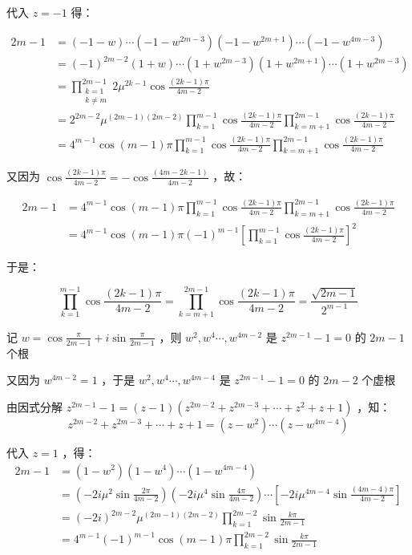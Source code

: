 代入 $z=-1$ 得：

\begin{equation}
\begin{aligned}
2m-1&=(-1-w)\cdots(-1-w^{2m-3})(-1-w^{2m+1})\cdots(-1-w^{4m-3})\\ &=(-1)^{2m-2}(1+w)\cdots(1+w^{2m-3})(1+w^{2m+1})\cdots(1+w^{2m-3})\\ &=\prod_{\substack{k=1\\k\neq m}}^{2m-1}2\mu^{2k-1}\cos\frac{(2k-1)\pi}{4m-2}\\ &=2^{2m-2}\mu^{(2m-1)(2m-2)}\prod_{k=1}^{m-1}\cos{\frac{(2k-1)\pi}{4m-2}}\prod_{k=m+1}^{2m-1}\cos{\frac{(2k-1)\pi}{4m-2}}\\ &=4^{m-1}\cos(m-1)\pi\prod_{k=1}^{m-1}\cos{\frac{(2k-1)\pi}{4m-2}}\prod_{k=m+1}^{2m-1}\cos{\frac{(2k-1)\pi}{4m-2}}
\end{aligned}
\end{equation}

又因为 $\displaystyle{\cos\frac{(2k-1)\pi}{4m-2}=-\cos\frac{(4m-2k-1)}{4m-2}}$ ，故：

\begin{equation}
\begin{aligned}
2m-1&=4^{m-1}\cos(m-1)\pi\prod_{k=1}^{m-1}\cos{\frac{(2k-1)\pi}{4m-2}}\prod_{k=m+1}^{2m-1}\cos{\frac{(2k-1)\pi}{4m-2}}\\ &=4^{m-1}\cos(m-1)\pi(-1)^{m-1}\left[\prod_{k=1}^{m-1}\cos{\frac{(2k-1)\pi}{4m-2}}\right]^2
\end{aligned}
\end{equation}

于是：

\begin{equation}%
\prod_{k=1}^{m-1}\cos{\frac{(2k-1)\pi}{4m-2}}=\prod_{k=m+1}^{2m-1}\cos{\frac{(2k-1)\pi}{4m-2}}=\frac{\sqrt{2m-1}}{2^{m-1}}
\end{equation}

记 $\displaystyle{w=\cos\frac{\pi}{2m-1}+i\sin\frac{\pi}{2m-1}}$ ，则 $w^2,w^4\cdots,w^{4m-2}$ 是 $z^{2m-1}-1=0$ 的 $2m-1$ 个根

又因为 $w^{4m-2}=1$ ，于是 $w^2,w^4\cdots ,w^{4m-4}$ 是 $z^{2m-1}-1=0$ 的 $2m-2$ 个虚根

由因式分解 $\displaystyle{z^{2m-1}-1=(z-1)(z^{2m-2}+z^{2m-3}+\cdots+z^{2}+z+1)}$ ，知：
$$z^{2m-2}+z^{2m-3}+\cdots+z+1=(z-w^2)\cdots(z-w^{4m-4})$$

代入 $z=1$ ，得：
$$\begin{aligned} 2m-1&=(1-w^2)(1-w^4)\cdots(1-w^{4m-4})\\ &=\left(-2i\mu^2\sin\frac{2\pi}{4m-2}\right)\left(-2i\mu^4\sin\frac{4\pi}{4m-2}\right)\cdots\left[-2i\mu^{4m-4}\sin\frac{(4m-4)\pi}{4m-2}\right]\\ &=(-2i)^{2m-2}\mu^{(2m-1)(2m-2)}\prod_{k=1}^{2m-2}\sin\frac{k\pi}{2m-1}\\ &=4^{m-1}(-1)^{m-1}\cos(m-1)\pi\prod_{k=1}^{2m-2}\sin\frac{k\pi}{2m-1} \end{aligned} $$

